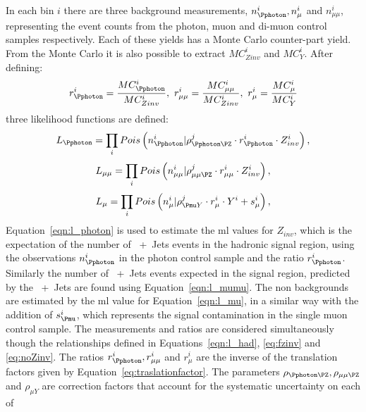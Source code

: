 In each \HT bin $i$ there are three background measurements, $n_{\Pphoton}^{i}, 
n^{i}_{\mu}$ and $n^{i}_{\mu\mu}$, representing the event counts from the 
photon, muon and di-muon control samples respectively. Each of these yields has 
a Monte Carlo counter-part yield. From the Monte Carlo it is also possible to 
extract $MC^{i}_{Zinv}$ and $MC^{i}_{Y}$. After defining:
\begin{equation}
  r^{i}_{\Pphoton} = \frac{MC^{i}_{\Pphoton}}{MC^{i}_{Zinv}},~ r^{i}_{\mu\mu} = \frac{MC^{i}_{\mu\mu}}{MC^{i}_{Zinv}},~r^{i}_{\mu} = \frac{MC^{i}_{\mu}}{MC^{i}_{Y}}
\end{equation}
three likelihood functions are defined:
\begin{equation}
  L_{\Pphoton} = \prod_{i}Pois\left(n^{i}_\Pphoton|\rho^{j}_{\Pphoton\PZ} \cdot  r^{i}_{\Pphoton}\cdot  Z_{inv}^{i} \right),
  \label{eqn:l_photon}
\end{equation}
\begin{equation}
  L_{\mu\mu} = \prod_{i}Pois\left(n^{i}_{\mu\mu}|\rho^{j}_{\mu\mu\PZ}\cdot r^{i}_{\mu\mu}\cdot  Z^{i}_{inv}\right),
  \label{eqn:l_mumu}
\end{equation}
\begin{equation}
  L_{\mu} = \prod_{i}Pois\left(n^{i}_{\mu}|\rho^{j}_{\Pmu Y}\cdot  r^{i}_{\mu}\cdot  Y^{i}+s^{i}_{\mu}\right),
  \label{eqn:l_mu}
\end{equation}
Equation~\eqref{eqn:l_photon} is used to estimate the \ac{ml} values for 
$Z_{inv}$, which is the expectation of the number of 
\HepProcess{\PZ\to\Pnu\Pnu}~+~Jets events in the hadronic signal region, using 
the observations $n_{\Pphoton}^{i}$ in the photon control sample and the ratio 
$r^{i}_{\Pphoton}$. Similarly the number of \HepProcess{\PZ\to\Pnu\Pnu}~+~Jets 
events expected in the signal region, predicted by the 
\HepProcess{\PZ\to\Pmu\Pmu}~+~Jets are found using Equation~\eqref{eqn:l_mumu}. 
The non \HepProcess{\PZ\to\Pnu\Pnu} backgrounds are estimated by the \ac{ml} 
value for Equation~\eqref{eqn:l_mu}, in a similar way with the addition of 
$s^{i}_{\Pmu}$, which represents the signal contamination in the single muon 
control sample. The measurements and ratios are considered simultaneously 
though the relationships defined in Equations~\eqref{eqn:l_had}, \eqref{eq:fzinv} and \eqref{eq:noZinv}.
The ratios $r^{i}_{\Pphoton}, r^{i}_{\mu\mu}$ and $r^{i}_{\mu}$ are the inverse 
of the translation factors given by Equation~\eqref{eq:traslationfactor}. The 
parameters $\rho_{\Pphoton\PZ}, \rho_{\mu\mu\PZ}$ and $\rho_{\mu Y}$ 
are correction factors that account for the systematic uncertainty on each of 
